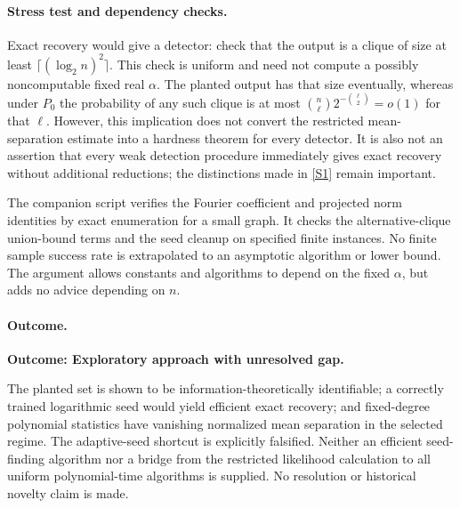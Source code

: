 \documentclass[11pt,a4paper]{article}
\newcommand{\sref}[2]{\hyperlink{source:#1:#2}{[S#2]}}
\numberwithin{equation}{section}
\begin{document}
\paragraph{Stress test and dependency checks.}
Exact recovery would give a detector: check that the output is a
clique of size at least $\lceil(\log_2 n)^2\rceil$.  This check is
uniform and need not compute a possibly noncomputable fixed real
$\alpha$.  The planted output has that size eventually, whereas under
$P_0$ the probability of any such clique is at most
$\binom n\ell2^{-\binom\ell2}=o(1)$ for that $\ell$.
However, this implication does not convert the restricted
mean-separation estimate into a hardness theorem for every detector.
It is also not an assertion that every weak detection procedure
immediately gives exact recovery without additional reductions;
the distinctions made in \sref{statement}{1} remain important.

The companion script verifies the Fourier coefficient and projected
norm identities by exact enumeration for a small graph.  It checks
the alternative-clique union-bound terms and the seed cleanup on
specified finite instances.  No finite sample success rate is
extrapolated to an asymptotic algorithm or lower bound.  The argument
allows constants and algorithms to depend on the fixed $\alpha$, but
adds no advice depending on $n$.

\paragraph{Outcome.}
\textbf{Outcome: Exploratory approach with unresolved gap.}

The planted set is shown to be information-theoretically identifiable;
a correctly trained logarithmic seed would yield efficient exact
recovery; and fixed-degree polynomial statistics have vanishing
normalized mean separation in the selected regime.  The adaptive-seed
shortcut is explicitly falsified.  Neither an efficient seed-finding
algorithm nor a bridge from the restricted likelihood calculation to
all uniform polynomial-time algorithms is supplied.  No resolution
or historical novelty claim is made.
\end{document}
